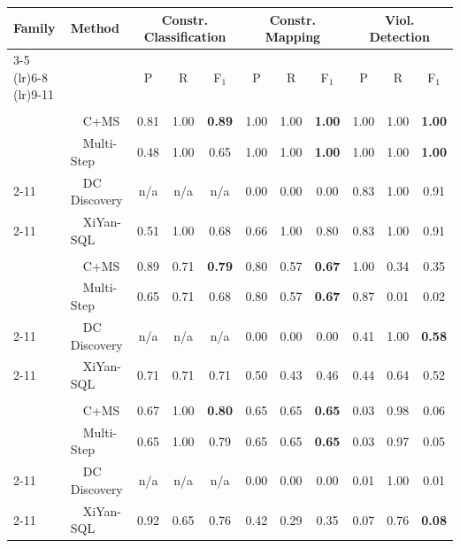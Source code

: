 \begin{tabular}{llccccccccc}
\toprule
\textbf{Family} & \textbf{Method} & \multicolumn{3}{c}{Constr. Classification} & \multicolumn{3}{c}{Constr. Mapping} & \multicolumn{3}{c}{Viol. Detection} \\
\cmidrule(lr){3-5}  \cmidrule(lr){6-8}  \cmidrule(lr){9-11}
 &  & P & R & F$_1$ & P & R & F$_1$ & P & R & F$_1$ \\
\midrule
\addlinespace[2pt]
\multicolumn{11}{c}{\textbf{Hospital}} \\
\addlinespace[1pt]
\multirow{2}{*}{\system} & ~~C+MS & 0.81 & 1.00 & \textbf{0.89} & 1.00 & 1.00 & \textbf{1.00} & 1.00 & 1.00 & \textbf{1.00} \\
 & ~~Multi-Step & 0.48 & 1.00 & 0.65 & 1.00 & 1.00 & \textbf{1.00} & 1.00 & 1.00 & \textbf{1.00} \\
\cmidrule(l){2-11}
\multirow{1}{*}{Profiling} & ~~DC Discovery & n/a & n/a & n/a & 0.00 & 0.00 & 0.00 & 0.83 & 1.00 & 0.91 \\
\cmidrule(l){2-11}
\multirow{1}{*}{Text2SQL} & ~~XiYan-SQL & 0.51 & 1.00 & 0.68 & 0.66 & 1.00 & 0.80 & 0.83 & 1.00 & 0.91 \\
\midrule
\addlinespace[2pt]
\multicolumn{11}{c}{\textbf{Restaurant}} \\
\addlinespace[1pt]
\multirow{2}{*}{\system} & ~~C+MS & 0.89 & 0.71 & \textbf{0.79} & 0.80 & 0.57 & \textbf{0.67} & 1.00 & 0.34 & 0.35 \\
 & ~~Multi-Step & 0.65 & 0.71 & 0.68 & 0.80 & 0.57 & \textbf{0.67} & 0.87 & 0.01 & 0.02 \\
\cmidrule(l){2-11}
\multirow{1}{*}{Profiling} & ~~DC Discovery & n/a & n/a & n/a & 0.00 & 0.00 & 0.00 & 0.41 & 1.00 & \textbf{0.58} \\
\cmidrule(l){2-11}
\multirow{1}{*}{Text2SQL} & ~~XiYan-SQL & 0.71 & 0.71 & 0.71 & 0.50 & 0.43 & 0.46 & 0.44 & 0.64 & 0.52 \\
\midrule
\addlinespace[2pt]
\multicolumn{11}{c}{\textbf{SISU}} \\
\addlinespace[1pt]
\multirow{2}{*}{\system} & ~~C+MS & 0.67 & 1.00 & \textbf{0.80} & 0.65 & 0.65 & \textbf{0.65} & 0.03 & 0.98 & 0.06 \\
 & ~~Multi-Step & 0.65 & 1.00 & 0.79 & 0.65 & 0.65 & \textbf{0.65} & 0.03 & 0.97 & 0.05 \\
\cmidrule(l){2-11}
\multirow{1}{*}{Profiling} & ~~DC Discovery & n/a & n/a & n/a & 0.00 & 0.00 & 0.00 & 0.01 & 1.00 & 0.01 \\
\cmidrule(l){2-11}
\multirow{1}{*}{Text2SQL} & ~~XiYan-SQL & 0.92 & 0.65 & 0.76 & 0.42 & 0.29 & 0.35 & 0.07 & 0.76 & \textbf{0.08} \\

\end{tabular}
